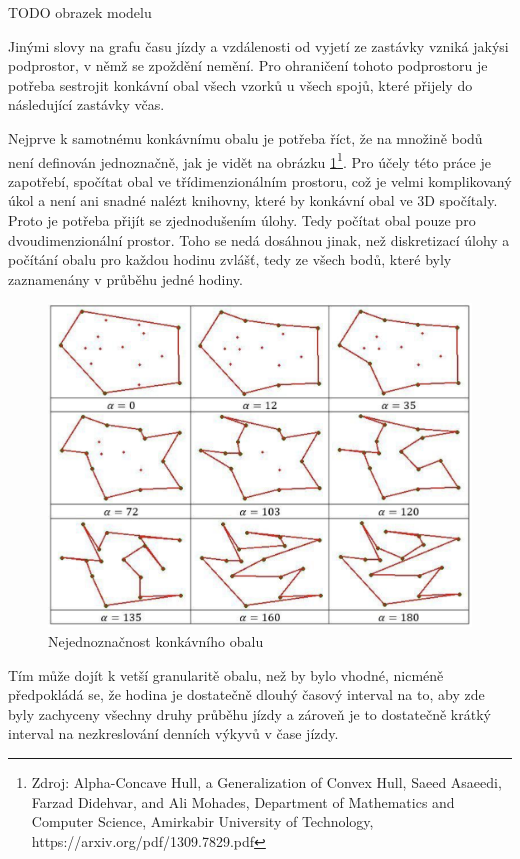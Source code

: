 \bigbreak


TODO obrazek modelu


\bigbreak


Jinými slovy na grafu času jízdy a vzdálenosti od vyjetí ze zastávky vzniká jakýsi podprostor, v němž se zpoždění nemění. Pro ohraničení tohoto podprostoru je potřeba sestrojit konkávní obal všech vzorků u všech spojů, které přijely do následující zastávky včas.


\bigbreak


Nejprve k samotnému konkávnímu obalu je potřeba říct, že na množině bodů není definován jednoznačně, jak je vidět na obrázku \ref{fig:konkavni_obal_nejednoznacny}\footnote{Zdroj: Alpha-Concave Hull, a Generalization of Convex Hull, Saeed Asaeedi, Farzad Didehvar, and Ali Mohades, Department of Mathematics and Computer Science, Amirkabir University of Technology, https://arxiv.org/pdf/1309.7829.pdf}. Pro účely této práce je zapotřebí, spočítat obal ve třídimenzionálním prostoru, což je velmi komplikovaný úkol a není ani snadné nalézt knihovny, které by konkávní obal ve 3D spočítaly. Proto je potřeba přijít se zjednodušením úlohy. Tedy počítat obal pouze pro dvoudimenzionální prostor. Toho se nedá dosáhnou jinak, než diskretizací úlohy a počítání obalu pro každou hodinu zvlášť, tedy ze všech bodů, které byly zaznamenány v průběhu jedné hodiny.


\begin{figure}
\centering
  \includegraphics[width=0.8\linewidth]{../img/konkavni_obal_nejednoznacny.png}
  \caption{Nejednoznačnost konkávního obalu}
  \label{fig:konkavni_obal_nejednoznacny}
\end{figure}


\bigbreak


 Tím může dojít k vetší granularitě obalu, než by bylo vhodné, nicméně předpokládá se, že hodina je dostatečně dlouhý časový interval na to, aby zde byly zachyceny všechny druhy průběhu jízdy a zároveň je to dostatečně krátký interval na nezkreslování denních výkyvů v čase jízdy.


